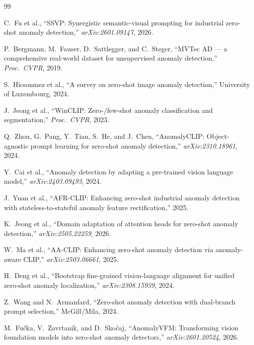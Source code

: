 \documentclass[11pt]{article}
\begin{document}
\begin{thebibliography}{99}

C.~Fu et al., ``SSVP: Synergistic semantic-visual prompting for industrial zero-shot anomaly detection,'' \textit{arXiv:2601.09147}, 2026.

P.~Bergmann, M.~Fauser, D.~Sattlegger, and C.~Steger, ``MVTec AD — a comprehensive real-world dataset for unsupervised anomaly detection,'' \textit{Proc.\ CVPR}, 2019.

S.~Hicsonmez et al., ``A survey on zero-shot image anomaly detection,'' University of Luxembourg, 2024.

J.~Jeong et al., ``WinCLIP: Zero-/few-shot anomaly classification and segmentation,'' \textit{Proc.\ CVPR}, 2023.

Q.~Zhou, G.~Pang, Y.~Tian, S.~He, and J.~Chen, ``AnomalyCLIP: Object-agnostic prompt learning for zero-shot anomaly detection,'' \textit{arXiv:2310.18961}, 2024.

Y.~Cai et al., ``Anomaly detection by adapting a pre-trained vision language model,'' \textit{arXiv:2403.09493}, 2024.

J.~Yuan et al., ``AFR-CLIP: Enhancing zero-shot industrial anomaly detection with stateless-to-stateful anomaly feature rectification,'' 2025.

K.~Jeong et al., ``Domain adaptation of attention heads for zero-shot anomaly detection,'' \textit{arXiv:2505.22259}, 2026.

W.~Ma et al., ``AA-CLIP: Enhancing zero-shot anomaly detection via anomaly-aware CLIP,'' \textit{arXiv:2503.06661}, 2025.

H.~Deng et al., ``Bootstrap fine-grained vision-language alignment for unified zero-shot anomaly localization,'' \textit{arXiv:2308.15939}, 2024.

Z.~Wang and N.~Armanfard, ``Zero-shot anomaly detection with dual-branch prompt selection,'' McGill/Mila, 2024.

M.~Fučka, V.~Zavrtanik, and D.~Skočaj, ``AnomalyVFM: Transforming vision foundation models into zero-shot anomaly detectors,'' \textit{arXiv:2601.20524}, 2026.


\end{thebibliography}
\end{document}
